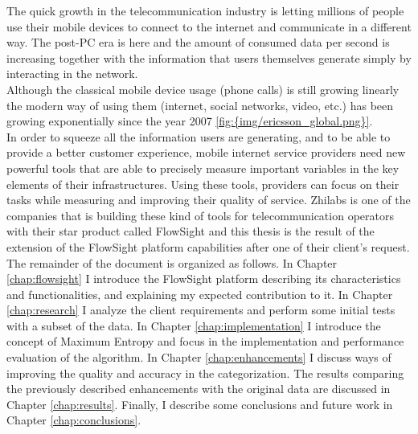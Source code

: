 
The quick growth in the telecommunication industry is letting millions of people use their mobile devices to connect to the internet and communicate in a different way. The post-PC era is here and
the amount of consumed data per second is increasing together with the information that users themselves generate simply by interacting in the network.\\
Although the classical mobile device usage (phone calls) is still growing linearly the modern way of using them (internet, social networks, video, etc.) has been growing exponentially since the year 
2007 \ref{fig:{img/ericsson_global.png}}.
 \\
In order to squeeze all the information users are generating, and to be able to provide a better customer experience, mobile internet service providers need new powerful tools that are able to precisely
measure important variables in the key elements of their infrastructures. Using these tools, providers can focus on their tasks while measuring and improving their quality of service.
Zhilabs is one of the companies that is building these kind of tools for telecommunication operators with their star product called FlowSight\cite{flowsight} and this thesis is the result of the 
extension of the FlowSight platform capabilities after one of their client's request.  \\ 
The remainder of the document is organized as follows. In Chapter \ref{chap:flowsight} I introduce the FlowSight platform describing its characteristics and functionalities, and explaining my
expected contribution to it. In Chapter \ref{chap:research} I analyze the client requirements and perform some initial tests with a subset of the data. In Chapter \ref{chap:implementation} I introduce
the concept of Maximum Entropy and focus in the implementation and performance evaluation of the algorithm. In Chapter \ref{chap:enhancements} I discuss ways of improving the quality and accuracy
in the categorization. The results comparing the previously described enhancements with the original data are discussed in Chapter \ref{chap:results}. Finally, I describe some conclusions and future 
work in Chapter \ref{chap:conclusions}.
